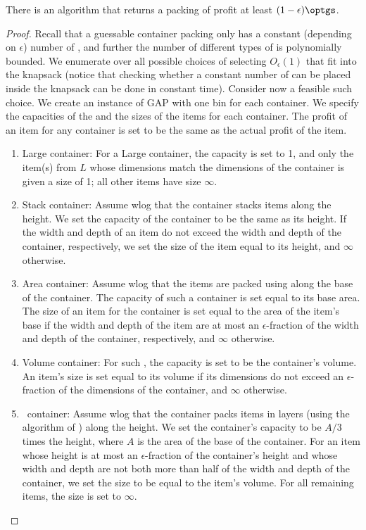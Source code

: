 \begin{theorem}
\label{thm:GAP}
    There is an algorithm that returns a packing of profit at least $(1-\epsilon)\optgs$.
\end{theorem}
\begin{proof}
    Recall that a guessable container packing only has a constant (depending on $\epsilon$) number of \boxes, and further the number of different types of \boxes is polynomially bounded. We enumerate over all possible choices of selecting $O_{\epsilon}(1)$ \boxes that fit into the knapsack (notice that checking whether a constant number of \boxes can be placed inside the knapsack can be done in constant time). Consider now a feasible such choice. We create an instance of GAP with one bin for each container. We specify the capacities of the \boxes and the sizes of the items for each container. The profit of an item for any container is set to be the same as the actual profit of the item.
    \begin{enumerate}
        \item Large container: For a Large container, the capacity is set to 1, and only the item(s) from $L$ whose dimensions match the dimensions of the container is given a size of 1; all other items have size $\infty$.
        \item Stack container: Assume wlog that the container stacks items along the height. We set the capacity of the container to be the same as its height. If the width and depth of an item do not exceed the width and depth of the container, respectively, we set the size of the item equal to its height, and $\infty$ otherwise.
        \item Area container: Assume wlog that the items are packed using \NFDH along the base of the container. The capacity of such a container is set equal to its base area. The size of an item for the container is set equal to the area of the item's base if the width and depth of the item are at most an $\epsilon$-fraction of the width and depth of the container, respectively, and $\infty$ otherwise.
        \item Volume container: For such \boxes, the capacity is set to be the container's volume. An item's size is set equal to its volume if its dimensions do not exceed an $\epsilon$-fraction of the dimensions of the container, and $\infty$ otherwise.  
        \item \lca\ container: Assume wlog that the container packs items in layers (using the algorithm of \cite{li1990three}) along the height. We set the container's capacity to be $A/3$ times the height, where $A$ is the area of the base of the container. For an item whose height is at most an $\epsilon$-fraction of the container's height and whose width and depth are not both more than half of the width and depth of the container, we set the size to be equal to the item's volume. For all remaining items, the size is set to $\infty$.

\end{enumerate}
\end{proof}
